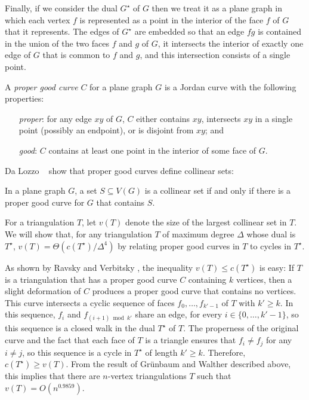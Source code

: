 \documentclass[a4paper,UKenglish]{socg-lipics-v2019}
\newcommand{\dual}[1]{{#1}^\star}
\begin{document}
Finally, if we consider the dual $\dual{G}$ of $G$ then we treat it
as a plane graph in which each vertex $f$ is represented as a point in
the interior of the face $f$ of $G$ that it represents.  The edges of
$\dual{G}$ are embedded so that an edge $fg$ is contained in the union of
the two faces $f$ and $g$ of $G$, it intersects the interior of exactly
one edge of $G$ that is common to $f$ and $g$, and this intersection
consists of a single point.

A \emph{proper good curve} $C$ for a plane graph $G$ is a
Jordan curve with the following properties:
\begin{enumerate}
	\item[\emph{proper}:] for any edge $xy$ of $G$, $C$ either contains $xy$, intersects
  $xy$ in a single point (possibly an endpoint), or is disjoint
  from $xy$; and
  \item[\emph{good}:] $C$ contains at least one point in the interior of
  some face of $G$.
\end{enumerate}

Da Lozzo \etal\ \cite{dalozzo.dujmovic.ea:drawing} show that proper good
curves define collinear sets:

\begin{thm}
  In a plane graph $G$, a set $S\subseteq V(G)$ is a collinear set if
  and only if there is a proper good curve for $G$ that contains $S$.
\end{thm}

For a triangulation $T$, let $v(T)$ denote the size of the largest
collinear set in $T$.  We will show that, for any triangulation $T$
of maximum degree $\Delta$
whose dual is $\dual{T}$, $v(T)=\Theta(c(\dual{T})/\Delta^4)$ by relating proper good curves in $T$ to cycles in $\dual{T}$.

As shown by Ravsky and Verbitsky
\cite{ravsky.verbitsky:on,ravsky.verbitsky:on-arxiv}, the inequality $v(T)
\le c(\dual{T})$ is easy: If $T$ is a triangulation that has a proper
good curve $C$ containing $k$ vertices, then a slight deformation of
$C$ produces a proper good curve that contains no vertices. This curve
intersects a cyclic sequence of faces $f_0,\ldots,f_{k'-1}$ of $T$
with $k'\ge k$.  In this sequence, $f_i$ and $f_{(i+1)\bmod k'}$ share
an edge, for every $i\in\{0,\ldots,k'-1\}$, so this sequence is a closed
walk in the dual $\dual{T}$ of $T$.  The properness of the original curve
and the fact that each face of $T$ is a triangle ensures that $f_i\neq
f_j$ for any $i\neq j$, so this sequence is a cycle in $\dual{T}$ of
length $k'\ge k$.  Therefore, $c(\dual{T})\ge v(T)$. From the result
of Gr\"unbaum and Walther described above, this implies that there are
$n$-vertex triangulations $T$ such that $v(T) = O(n^{0.9859})$.
\end{document}
